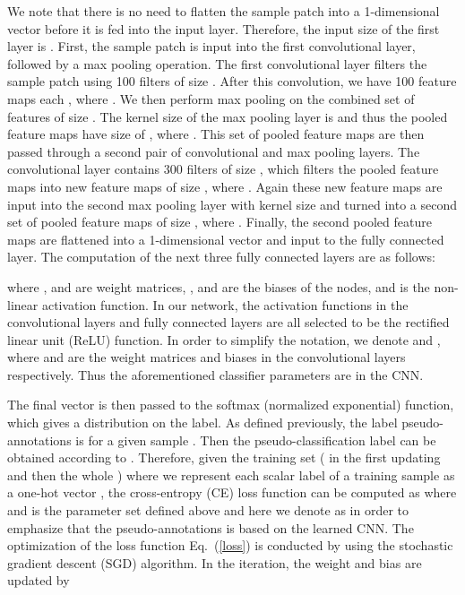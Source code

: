 \documentclass[journal]{IEEEtran}
\begin{document}
	We note that there is no need to flatten the sample patch  into a 1-dimensional vector before it is fed into the input layer. Therefore, the input size of the first layer is . First, the sample patch is input into the first convolutional layer, followed by a max pooling operation. The first convolutional layer filters the   sample patch using 100 {{filters}} of size {{}}. After this convolution, we have 100 feature maps each , where . We then perform max pooling on the combined set of features of size . The kernel size of the max pooling layer is  and thus the pooled feature maps have size of , where . This set of pooled feature maps are then passed through a second pair of convolutional and max pooling layers. The convolutional layer contains 300 {{filters}} of size {{}}, which filters 
the pooled feature maps into new feature maps of size , where . Again these new feature maps are input into the second max pooling 
	layer with kernel size  and turned into a second set of pooled feature maps of size , where . Finally, the second pooled feature maps are flattened into a 1-dimensional vector  and input to the fully connected layer. The computation of the next three fully connected layers are as follows: 
	
	where ,  and  are weight matrices, ,  and  are the biases of the nodes, and  is the non-linear activation function. In our network, the activation functions in the convolutional layers and fully connected layers are all selected to be the rectified linear unit (ReLU) function. In order to simplify the notation, we denote  and , where  and  are the weight matrices and biases in the convolutional layers respectively. {{Thus the aforementioned classifier parameters  are  in the CNN.}}
	
	The final vector  is then passed to the softmax (normalized exponential) function, which gives a distribution on the label. As defined previously, the label {{pseudo-annotations}} is  for a given sample . Then the {{pseudo-classification}} label can be obtained according to . Therefore, given the training set {{( in the first updating and then the whole )}} where we represent each scalar label  of a training sample as a one-hot vector , the cross-entropy (CE) loss function can be computed as
	{{ }}where  and  is the parameter set defined above {{and here we denote  as  in order to emphasize that the pseudo-annotations  is based on the learned CNN.}} The optimization of the loss function Eq.\ (\ref{loss}) is conducted by using the stochastic gradient descent (SGD) algorithm. In the  iteration, the weight and bias are updated by
	
\end{document}
